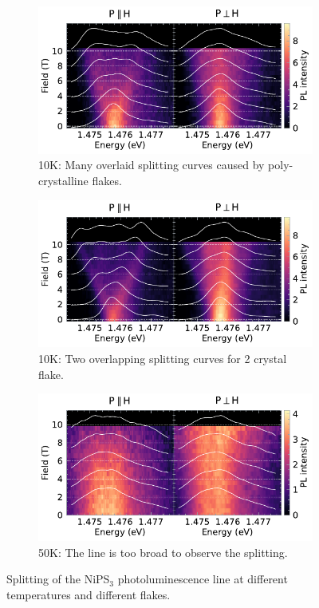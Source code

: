 \documentclass[
	twoside,
	parskip=half,
	a4paper,
]{scrbook}
\begin{document}
\begin{figure}
	\centering
	\begin{subfigure}{4in}
		\includegraphics{../figures/2024-04-18 NiPS4 splitting 10K.pdf}
		\caption{10K: Many overlaid splitting curves caused by poly-crystalline flakes.}
		\label{fig:NiPS3 10K}
	\end{subfigure}
	\begin{subfigure}{4in}
		\includegraphics{../figures/2024-04-18 NiPS4 splitting 10K multiple flakes.pdf}
		\caption{10K: Two overlapping splitting curves for 2 crystal flake.}
		\label{fig:NiPS3 10K multiple flakes}
	\end{subfigure}
	\begin{subfigure}{4in}
		\includegraphics{../figures/2024-04-18 NiPS4 splitting 50K.pdf}
		\caption{50K: The line is too broad to observe the splitting.}
		\label{fig:NiPS3 50K}
	\end{subfigure}
	\caption{Splitting of the NiPS$_3$ photoluminescence line at different temperatures and different flakes.}
	\label{fig:NiPS3 multiple temperatures}
\end{figure}
\end{document}
